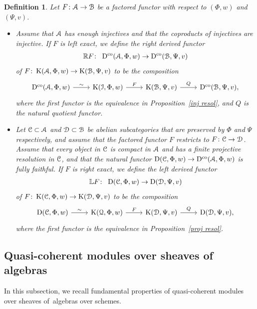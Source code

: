 \documentclass[pdftex]{sigma}%
\newtheorem{dfn}{Definition}[section]
\numberwithin{equation}{section}
\newcommand{\Dco}{\operatorname{D^{co}}}
\newcommand{\D}{\operatorname{D}}
\newcommand{\K}{\operatorname{K}}
\newcommand{\bL}{\mathbb{L}}
\newcommand{\bR}{\mathbb{R}}
\newcommand{\scrA}{\EuScript{A}}
\newcommand{\scrB}{\EuScript{B}}
\newcommand{\scrC}{\EuScript{C}}
\newcommand{\scrD}{\EuScript{D}}
\newcommand{\scrI}{\EuScript{I}}
\newcommand{\scrQ}{\EuScript{Q}}
\begin{document}
\begin{dfn} Let $F\colon \scrA\to \scrB$ be a factored functor with respect to $(\Phi,w)$ and $(\Psi,v)$.

\begin{itemize}\itemsep=0pt
\item[1.] Assume that $\scrA$ has enough injectives and that the coproducts of injectives are injective.
 If $F$ is left exact, we define the {\it right derived functor}
\begin{gather*}
\bR F\colon\ \Dco(\scrA,\Phi,w)\to \Dco(\scrB,\Psi,v)
\end{gather*}
of $F\colon \K(\scrA,\Phi, w)\to\K(\scrB,\Psi,v)$ to be the composition
\[
\begin{tikzcd}
\Dco(\scrA,\Phi,w)\arrow[r,"\sim"]&\K(\scrI,\Phi,w)\arrow[r,"F"]&\K(\scrB,\Psi,v)\arrow[r,"Q"]&\Dco(\scrB,\Psi,v),
\end{tikzcd}
\]
where the first functor is the equivalence in Proposition~\ref{inj resol}, and $Q$ is the natural quotient functor.

 \item[2.] Let $\scrC\subset \scrA$ and $\scrD\subset \scrB$ be abelian subcategories that are preserved by $\Phi$ and $\Psi$ respectively, and assume that the factored functor $F$ restricts to $F\colon \scrC\to \scrD$. Assume that every object in $\scrC$ is compact in $\scrA$ and has a finite projective resolution in $\scrC$, and that the natural functor $\D(\scrC,\Phi,w)\to \Dco(\scrA,\Phi,w)$ is fully faithful.
If $F$ is right exact, we define the {\it left derived functor}
\begin{gather*}
\bL F\colon\ \D(\scrC,\Phi,w)\to \D(\scrD,\Psi,v)
\end{gather*}
of $F\colon \K(\scrC,\Phi,w)\to \K(\scrD,\Psi,v)$ to be the composition
\[
\begin{tikzcd}
\D(\scrC,\Phi,w)\arrow[r,"\sim"]&\K(\scrQ,\Phi,w)\arrow[r,"F"]&\K(\scrD,\Psi,v)\arrow[r,"Q"]&\D(\scrD,\Psi,v),
\end{tikzcd}
\]
where the first functor is the equivalence in Proposition~\ref{proj resol}.
\end{itemize}
\end{dfn}

\subsection{Quasi-coherent modules over sheaves of algebras}

In this subsection, we recall fundamental properties of quasi-coherent modules over sheaves of~algebras over schemes.
\end{document}
